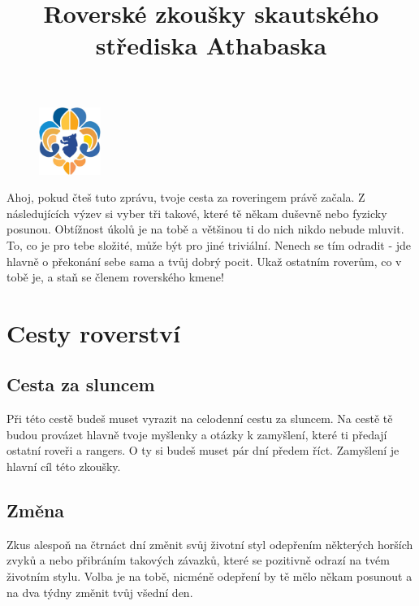 \documentclass[11pt, fleqn]{article}
\title{Roverské zkoušky skautského střediska Athabaska}
\author{}
\date{}
\begin{document}
\maketitle{}
\vspace{-20pt}

\begin{figure}
  \vspace{-30pt}
  \begin{center}
    \includegraphics[width=0.18\textwidth]{logo.png}
  \end{center}
  \vspace{-20pt}
\end{figure}

Ahoj, pokud čteš tuto zprávu, tvoje cesta za roveringem právě začala.
Z následujících výzev si vyber tři takové, které tě někam duševně nebo fyzicky posunou. Obtížnost úkolů je na tobě a většinou ti do nich nikdo nebude mluvit. To, co je pro tebe složité, může být pro jiné triviální. Nenech se tím odradit - jde hlavně o překonání sebe sama a tvůj dobrý pocit. Ukaž ostatním roverům, co v tobě je, a staň se členem roverského kmene!

\vspace{20pt}
\section*{Cesty roverství}
  \subsection*{Cesta za sluncem}
  Při této cestě budeš muset vyrazit na celodenní cestu za sluncem. Na cestě tě budou provázet hlavně tvoje myšlenky a otázky k zamyšlení, které ti předají ostatní roveři a rangers. O ty si budeš muset pár dní předem říct. Zamyšlení je hlavní cíl této zkoušky.
  \subsection*{Změna}
  Zkus alespoň na čtrnáct dní změnit svůj životní styl odepřením některých horších zvyků a nebo přibráním takových závazků, které se pozitivně odrazí na tvém životním stylu. Volba je na tobě, nicméně odepření by tě mělo někam posunout a na dva týdny změnit tvůj všední den.
\end{document}
